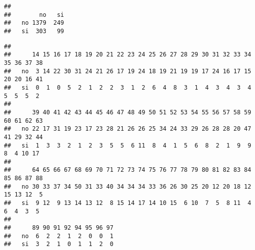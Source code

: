 \documentclass[]{article}
\newenvironment{Shaded}{\begin{snugshade}}{\end{snugshade}}
\newcommand{\KeywordTok}[1]{\textcolor[rgb]{0.13,0.29,0.53}{\textbf{#1}}}
\newcommand{\NormalTok}[1]{#1}
\newcommand{\OperatorTok}[1]{\textcolor[rgb]{0.81,0.36,0.00}{\textbf{#1}}}
\newcommand{\StringTok}[1]{\textcolor[rgb]{0.31,0.60,0.02}{#1}}
\begin{document}
\begin{Shaded}
\end{Shaded}

\begin{verbatim}
##     
##        no   si
##   no 1379  249
##   si  303   99
\end{verbatim}

\begin{Shaded}
\end{Shaded}

\begin{verbatim}
##     
##      14 15 16 17 18 19 20 21 22 23 24 25 26 27 28 29 30 31 32 33 34 35 36 37 38
##   no  3 14 22 30 31 24 21 26 17 19 24 18 19 21 19 19 17 24 16 17 15 20 20 16 41
##   si  0  1  0  5  2  1  2  2  3  1  2  6  4  8  3  1  4  3  4  3  4  5  5  5  2
##     
##      39 40 41 42 43 44 45 46 47 48 49 50 51 52 53 54 55 56 57 58 59 60 61 62 63
##   no 22 17 31 19 23 17 23 28 21 26 26 25 34 24 33 29 26 28 28 20 47 41 29 32 44
##   si  1  3  3  2  1  2  3  5  5  6 11  8  4  1  5  6  8  2  1  9  9  8  4 10 17
##     
##      64 65 66 67 68 69 70 71 72 73 74 75 76 77 78 79 80 81 82 83 84 85 86 87 88
##   no 30 33 37 34 50 31 33 40 34 34 34 33 36 26 30 25 20 12 20 18 12 15 13 12  5
##   si  9 12  9 13 14 13 12  8 15 14 17 14 10 15  6 10  7  5  8 11  4  6  4  3  5
##     
##      89 90 91 92 94 95 96 97
##   no  6  2  2  1  2  0  0  1
##   si  3  2  1  0  1  1  2  0
\end{verbatim}

\begin{Shaded}
\end{Shaded}
\end{document}
